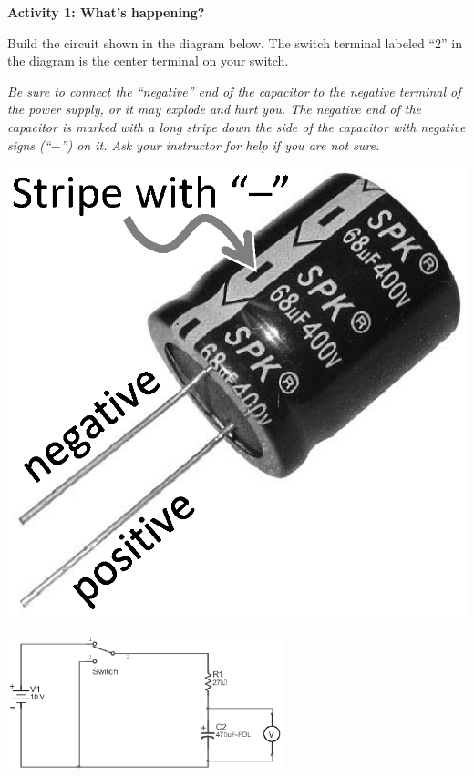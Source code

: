 \textbf{Activity 1: What's happening?}

Build the circuit shown in the diagram below.  The switch terminal labeled ``2'' in the diagram is the center terminal on your switch.

\begin{minipage}{0.82\textwidth}
\begin{newboxed}
\vspace{-0.2 in}
\textit{Be sure to connect the “negative” end of the capacitor to the negative terminal of the power supply, or it may explode and hurt you.  The negative end of the capacitor is marked with a long stripe down the side of the capacitor with negative signs (``$-$'') on it.  Ask your instructor for help if you are not sure.}
\vspace{-0.1 in}
\end{newboxed}
\end{minipage}
\begin{minipage}{0.17\textwidth}
\includegraphics[width=1.0\textwidth]{rc_circuits/capacitor2_bw.eps}
\end{minipage}

\begin{center}
\vspace{-0.3 in}
\includegraphics[width=0.6\textwidth]{rc_circuits/circuit_diagram_bw.eps}
\vspace{-0.1 in}
\end{center}

